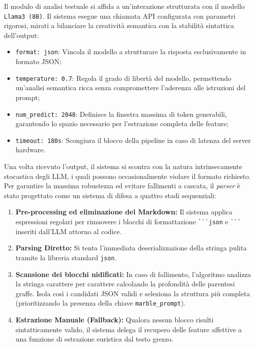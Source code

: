 \documentclass[11pt]{report}
\begin{document}
Il modulo di analisi testuale si affida a un'interazione strutturata con il modello \texttt{Llama3 (8B)}. Il sistema esegue una chiamata API configurata con parametri rigorosi, mirati a bilanciare la creatività semantica con la stabilità sintattica dell'output:
\begin{itemize}
    \item \texttt{format: json}: Vincola il modello a strutturare la risposta esclusivamente in formato JSON;
    \item \texttt{temperature: 0.7}: Regola il grado di libertà del modello, permettendo un'analisi semantica ricca senza compromettere l'aderenza alle istruzioni del prompt;
    \item \texttt{num\_predict: 2048}: Definisce la finestra massima di token generabili, garantendo lo spazio necessario per l'estrazione completa delle feature;
    \item \texttt{timeout: 180s}: Scongiura il blocco della pipeline in caso di latenza del server hardware.
\end{itemize}

Una volta ricevuto l'output, il sistema si scontra con la natura intrinsecamente stocastica degli LLM, i quali possono occasionalmente violare il formato richiesto. Per garantire la massima robustezza ed evitare fallimenti a cascata, il \textit{parser} è stato progettato come un sistema di difesa a quattro stadi sequenziali:

\begin{enumerate}
    \item \textbf{Pre-processing ed eliminazione del Markdown:} Il sistema applica espressioni regolari per rimuovere i blocchi di formattazione \verb|```json| e \verb|```| inseriti dall'LLM attorno al codice.
    \item \textbf{Parsing Diretto:} Si tenta l'immediata deserializzazione della stringa pulita tramite la libreria standard \texttt{json}.
    \item \textbf{Scansione dei blocchi nidificati:} In caso di fallimento, l'algoritmo analizza la stringa carattere per carattere calcolando la profondità delle parentesi graffe. Isola così i candidati JSON validi e seleziona la struttura più completa (prioritizzando la presenza della chiave \texttt{marble\_prompt}).
    \item \textbf{Estrazione Manuale (Fallback):} Qualora nessun blocco risulti sintatticamente valido, il sistema delega il recupero delle feature affettive a una funzione di estrazione euristica dal testo grezzo.
\end{enumerate}
 
\end{document}
